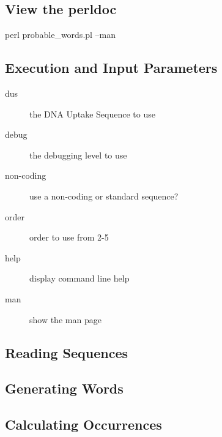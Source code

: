 \documentclass[12pt,notitlepage]{article}
\begin{document}
\begin{s5presentation}
\begin{ifhtml}
\begin{s5slide}
      \subsection{View the perldoc}
      perl probable_words.pl --man
    \end{s5slide}

    \begin{s5slide}
      \section{Execution and Input Parameters}
     
      \begin{description}
        \item[dus] the DNA Uptake Sequence to use
        \item[debug] the debugging level to use
        \item[non-coding] use a non-coding or standard sequence?
        \item[order] order to use from 2-5
        \item[help] display command line help
        \item[man] show the man page
      \end{description}
    \end{s5slide}

    \begin{s5slide}
      \section{Reading Sequences}
    \end{s5slide}

    \begin{s5slide}
      \section{Generating Words}
    \end{s5slide}

    \begin{s5slide}
      \section{Calculating Occurrences}
    \end{s5slide}


\end{ifhtml}
\end{s5presentation}
\end{document}
